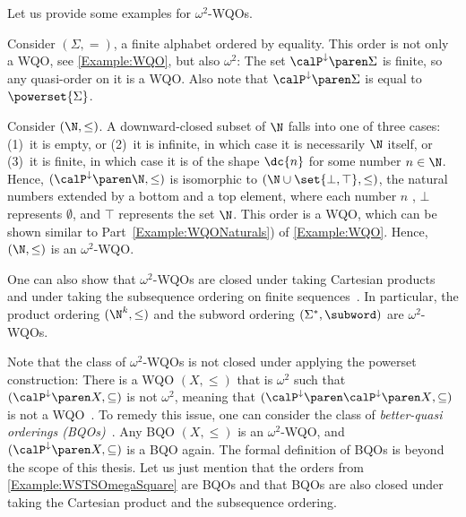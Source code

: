 \documentclass[../../diss.tex]{subfiles}
\begin{document}
Let us provide some examples for $\omega^2$-WQOs.

\begin{example}%
\label{Example:WSTSOmegaSquare}%
    \begin{thmenumerate}[a)]
        \item
            Consider $(\Sigma,=)$, a finite alphabet ordered by equality.
            This order is not only a WQO, see \cref{Example:WQO}, but also $\omega^2$:
            The set $\pwrsetdown{\Sigma}$ is finite, so any quasi-order on it is a WQO.\@
            Also note that $\pwrsetdown{\Sigma}$ is equal to $\powerset{\Sigma}$.
        \item
            Consider $(\N,\leq)$.
            A downward-closed subset of $\N$ falls into one of three cases:
            (1)~it is empty, or
            (2)~it is infinite, in which case it is necessarily $\N$ itself, or
            (3)~it is finite, in which case it is of the shape $\dc{n}$ for some number $n \in \N$.
            Hence, $(\pwrsetdown{\N},\leq)$ is isomorphic to $(\N \cup \set{\bot,\top},\leq)$, the natural numbers extended by a bottom and a top element, where each number $n$ , $\bot$ represents $\emptyset$, and $\top$ represents the set $\N$.
            This order is a WQO, which can be shown similar to Part~\ref{Example:WQONaturals}) of \cref{Example:WQO}.
            Hence, $(\N,\leq)$ is an $\omega^2$-WQO.\@
    \end{thmenumerate}
\end{example}

One can also show that $\omega^2$-WQOs are closed under taking Cartesian products and under taking the subsequence ordering on finite sequences~\cite{FinkelG09,FinkelG12}.
In particular, the product ordering $(\N^k,\leq)$ and the subword ordering $(\Sigma^*,\subword)$ are $\omega^2$-WQOs.

Note that the class of $\omega^2$-WQOs is not closed under applying the powerset construction:
There is a WQO $(X,\leq)$ that is $\omega^2$ such that $(\pwrsetdown{X},\subseteq)$ is not $\omega^2$, meaning that $(\pwrsetdown{\pwrsetdown{X}},\subseteq)$ is not a WQO~\cite{Jancar99}.
To remedy this issue, one can consider the class of \emph{better-quasi orderings (BQOs)}~\cite{NashWilliams68}.
Any BQO $(X,\leq)$ is an $\omega^2$-WQO, and $(\pwrsetdown{X},\subseteq)$ is a BQO again.
The formal definition of BQOs is beyond the scope of this thesis.
Let us just mention that the orders from \cref{Example:WSTSOmegaSquare} are BQOs and that BQOs are also closed under taking the Cartesian product and the subsequence ordering.
\end{document}
